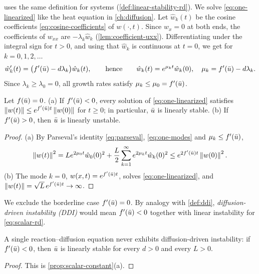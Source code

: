  uses the same definition for systems (\cref{def:linear-stability-rd}).
We solve \eqref{eq:one-linearized} like the heat equation in \cref{ch:diffusion}. Let
$\hat w_k(t)$ be the cosine coefficients \eqref{eq:cosine-coefficients} of $w(\cdot,t)$.
Since $w_x=0$ at both ends, the coefficients of $w_{xx}$ are $-\lambda_k\hat w_k$
(\cref{lem:coefficient-uxx}). Differentiating under the integral sign for $t>0$, and
using that $\hat w_k$ is continuous at $t=0$, we get for $k=0,1,2,\dots$
\begin{equation}\label{eq:one-modes}
  \hat w_k'(t) = \big(f'(\bar u)-d\lambda_k\big)\hat w_k(t),
  \qquad\text{hence}\qquad
  \hat w_k(t)=e^{\mu_kt}\hat w_k(0),\quad \mu_k = f'(\bar u)-d\lambda_k .
\end{equation}
Since $\lambda_k\ge\lambda_0=0$, all growth rates satisfy $\mu_k\le\mu_0=f'(\bar u)$.

\begin{proposition}\label{prop:scalar-constant}
Let $f(\bar u)=0$. (a) If $f'(\bar u)<0$, every solution of \eqref{eq:one-linearized}
satisfies $\left\lVert w(t)\right\rVert\le e^{f'(\bar u)t}\left\lVert w(0)\right\rVert$ for $t\ge0$; in particular, $\bar u$ is
linearly stable. (b) If $f'(\bar u)>0$, then $\bar u$ is linearly unstable.
\end{proposition}

\begin{proof}
(a) By Parseval's identity \eqref{eq:parseval}, \eqref{eq:one-modes} and
$\mu_k\le f'(\bar u)$,
\begin{equation*}
  \left\lVert w(t)\right\rVert^2 = Le^{2\mu_0t}\hat w_0(0)^2
     + \frac L2\sum_{k=1}^\infty e^{2\mu_kt}\hat w_k(0)^2
  \le e^{2f'(\bar u)t}\left\lVert w(0)\right\rVert^2 .
\end{equation*}
(b) The mode $k=0$, $w(x,t)=e^{f'(\bar u)t}$, solves \eqref{eq:one-linearized}, and
$\left\lVert w(t)\right\rVert=\sqrt L\,e^{f'(\bar u)t}\to\infty$.
\end{proof}

We exclude the borderline case $f'(\bar u)=0$. By analogy with \cref{def:ddi},
\emph{diffusion-driven instability (DDI)} would mean $f'(\bar u)<0$ together with linear
instability for \eqref{eq:scalar-rd}.

\begin{corollary}\label{cor:no-ddi-scalar}
A single reaction--diffusion equation never exhibits diffusion-driven instability: if
$f'(\bar u)<0$, then $\bar u$ is linearly stable for every $d>0$ and every $L>0$.
\end{corollary}

\begin{proof}
This is \cref{prop:scalar-constant}(a).
\end{proof}


